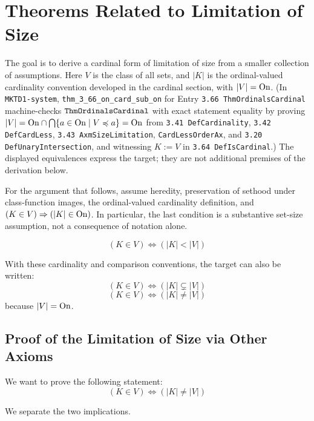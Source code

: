 \def\topic{Theorems related to Limitation of Size}

\section{Theorems Related to Limitation of Size}
\label{sec:limitation_of_size_theorems}




The goal is to derive a cardinal form of limitation of size from a smaller
collection of assumptions. Here $V$ is the class of all sets, and $|K|$ is
the ordinal-valued cardinality convention developed in the cardinal section,
with $|V|=\mathrm{On}$. (In \texttt{MKTD1-system}, \texttt{thm\_3\_66\_on\_card\_sub\_on} for Entry \texttt{3.66 ThmOrdinalsCardinal} machine-checks $\kernelstmt{ThmOrdinalsCardinal}$ with exact statement equality by proving $|V| = \mathrm{On} \cap \bigcap\{a \in \mathrm{On} \mid V \preccurlyeq a\} = \mathrm{On}$ from \texttt{3.41 DefCardinality}, \texttt{3.42 DefCardLess}, \texttt{3.43 AxmSizeLimitation}, \texttt{CardLessOrderAx}, and \texttt{3.20 DefUnaryIntersection}, and witnessing $K := V$ in \texttt{3.64 DefIsCardinal}.) The displayed equivalences express the target; they are not
additional premises of the derivation below.

For the argument that follows, assume heredity, preservation of sethood
under class-function images, the ordinal-valued cardinality definition, and
$(K\in V)\Rightarrow(|K|\in\mathrm{On})$. In particular, the last condition is a
substantive set-size assumption, not a consequence of notation alone.

\begin{iaxiom}
\[
(K\in V)
\iff
(|K| < |V|)
\]
\end{iaxiom}

With these cardinality and comparison conventions, the target can also be written:
\[
(K\in V)
\iff
(|K| \subsetneq |V|)
\]
\[
(K\in V)
\iff
(|K| \neq |V|)
\]
because $|V|=\mathrm{On}$.


\subsection{Proof of the Limitation of Size via Other Axioms}
\label{subsec:limitation_of_size_proof}
We want to prove the following statement:
\[
(K \in V) \iff (|K| \neq |V|)
\]

We separate the two implications.



